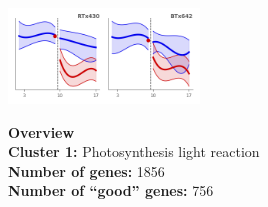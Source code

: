 \begin{multicols}{2}
\includegraphics[width=2in]{figures/clusters/leaf_Postflowering_0.png}
\columnbreak

\noindent \textbf{Overview}\\\textbf{Cluster 1:} Photosynthesis light reaction \\
\textbf{Number of genes:} 1856 \\
\textbf{Number of ``good'' genes:} 756 \\
\end{multicols}

